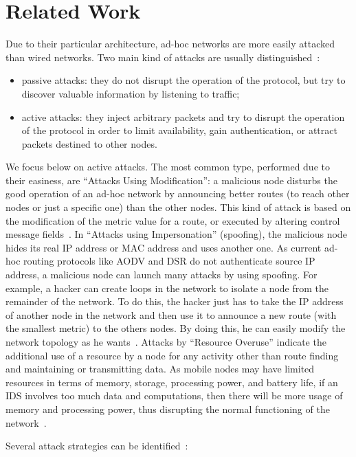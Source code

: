 \documentclass[compsoc, conference, letterpaper, 10pt, times]{IEEEtran}
\begin{document}
\section{Related Work}\label{sec:related}


Due to their particular architecture, ad-hoc networks are more easily attacked than wired networks. Two main kind of attacks are usually distinguished~\cite[p.956]{survey3}:

\begin{itemize}
\item  passive attacks: they do not disrupt the operation of the protocol, but try to discover valuable information by listening to traffic;
\item active attacks: they inject arbitrary packets and try to disrupt the operation of the protocol in order to limit availability,
gain authentication, or attract packets destined to other nodes.
\end{itemize}
We focus below on active attacks. The most common type, performed due to their easiness, are ``Attacks Using Modification'': a malicious node disturbs the good operation of an ad-hoc
network by announcing better routes (to reach other nodes or just a specific one) than the other nodes. This kind of attack is based on the modification of the metric value for a route, or executed by
altering control message fields~\cite[p.956]{survey3}. In ``Attacks using Impersonation'' (spoofing), the malicious node hides its real IP address or MAC address and uses another one. As current ad-hoc routing protocols like AODV and DSR do not authenticate source IP address, a malicious node can launch many attacks by using spoofing. For example, a hacker can create loops in the network to isolate a node from the remainder of the network. To do this, the hacker just has to take the IP address of another node in the network and then use it to announce a new route (with the smallest metric) to the others nodes. By doing this, he can easily modify the
network topology as he wants~\cite[p.956]{survey3}. Attacks by ``Resource Overuse'' indicate the additional use of a resource by a node for any activity other than route finding and maintaining or
transmitting data. As mobile nodes may have limited resources in terms of memory, storage, processing power, and battery life, if an IDS involves too much data and computations, then there will be more usage of memory and  processing power, thus disrupting the normal functioning of the network~\cite[p.388]{survey9}.

Several attack strategies can be identified~\cite[p.345]{A}:
\end{document}
